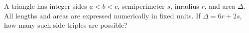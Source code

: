 A triangle has integer sides $a<b<c$, semiperimeter $s$, inradius $r$, and area $\Delta$. All lengths and areas are expressed numerically in fixed units. If $\Delta=6r+2s$, how many such side triples are possible?
